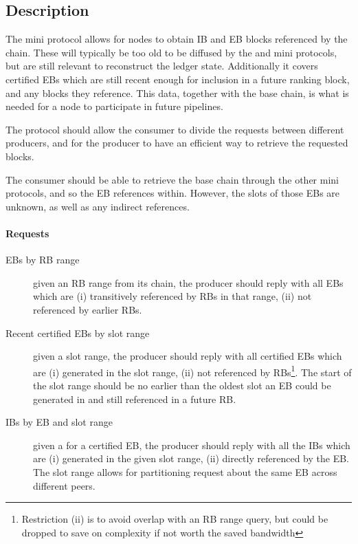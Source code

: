 \subsection{Description}
The \catchup{} mini protocol allows for nodes to obtain IB and EB
blocks referenced by the chain. These will typically be too old to be
diffused by the \relay{} and \fetch{} mini protocols, but are still
relevant to reconstruct the ledger state. Additionally it covers
certified EBs which are still recent enough for inclusion in a future
ranking block, and any blocks they reference. This data, together with
the base chain, is what is needed for a node to participate in future
pipelines.

The protocol should allow the consumer to divide the requests between
different producers, and for the producer to have an efficient way to
retrieve the requested blocks.

The consumer should be able to retrieve the base chain through the
other mini protocols, and so the EB references within. However, the
slots of those EBs are unknown, as well as any indirect references.

\paragraph{Requests}
\begin{description}
\item[EBs by RB range] given an RB range from its chain, the producer
  should reply with all EBs which are (i) transitively referenced by RBs in that
  range, (ii) not referenced by earlier RBs.
\item[Recent certified EBs by slot range] given a slot range, the
  producer should reply with all certified EBs which are (i) generated
  in the slot range, (ii) not referenced by RBs\footnote{Restriction
  (ii) is to avoid overlap with an RB range query, but could be dropped to save on complexity if not worth the saved bandwidth}. The start of the
  slot range should be no earlier than the oldest slot an EB could be
  generated in and still referenced in a future RB.
\item[IBs by EB \point{} and slot range] given a \point{} for a
  certified EB, the producer should reply with all the IBs which are (i)
  generated in the given slot range, (ii) directly referenced by
  the EB. The slot range allows for partitioning request about the
  same EB across different peers.
\end{description}
